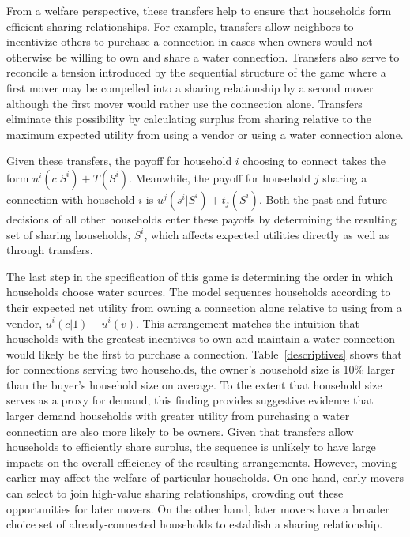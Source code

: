\documentclass[12pt]{article}
\begin{document}
From a welfare perspective, these transfers help to ensure that households form efficient sharing relationships.  For example, transfers allow neighbors to incentivize others to purchase a connection in cases when owners would not otherwise be willing to own and share a water connection.  Transfers also serve to reconcile a tension introduced by the sequential structure of the game where a first mover may be compelled into a sharing relationship by a second mover although the first mover would rather use the connection alone.  Transfers eliminate this possibility by calculating surplus from sharing relative to the maximum expected utility from using a vendor or using a water connection alone.  

Given these transfers, the payoff for household $i$ choosing to connect takes the form $u^{i} (c|S^{i}) + T(S^{i})$.  Meanwhile, the payoff for household $j$ sharing a connection with household $i$ is $u^{j} (s^{i}|S^{i}) + t_{j}(S^{i})$.  Both the past and future decisions of all other households enter these payoffs by determining the resulting set of sharing households, $S^{i}$, which affects expected utilities directly as well as through transfers.

The last step in the specification of this game is determining the order in which households choose water sources.  The model sequences households according to their expected net utility from owning a connection alone relative to using from a vendor, $u^{i}(c|1) - u^{i}(v)$.  This arrangement matches the intuition that households with the greatest incentives to own and maintain a water connection would likely be the first to purchase a connection.  Table~\ref{descriptives} shows that for connections serving two households, the owner's household size is 10\% larger than the buyer's household size on average.  To the extent that household size serves as a proxy for demand, this finding provides suggestive evidence that larger demand households with greater utility from purchasing a water connection are also more likely to be owners.  Given that transfers allow households to efficiently share surplus, the sequence is unlikely to have large impacts on the overall efficiency of the resulting arrangements.  However, moving earlier may affect the welfare of particular households.  On one hand, early movers can select to join high-value sharing relationships, crowding out these opportunities for later movers.  On the other hand, later movers have a broader choice set of already-connected households to establish a sharing relationship.
\end{document}
